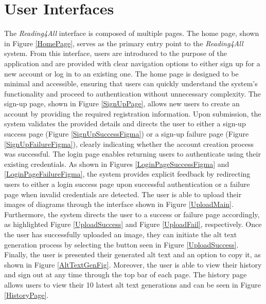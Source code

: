 \documentclass[12pt, titlepage]{article}
\begin{document}

\section{User Interfaces}

The \textit{Reading4All} interface is composed of multiple pages. The home page, shown in Figure \ref{HomePage}, 
serves as the primary entry point to the \textit{Reading4All} system. From this interface, users are introduced 
to the purpose of the application and are provided with clear navigation options to either sign up for a new account 
or log in to an existing one. The home page is designed to be minimal and accessible, ensuring that users can quickly 
understand the system’s functionality and proceed to authentication without unnecessary complexity.
The sign-up page, shown in Figure \ref{SignUpPage}, allows new users to create an account by providing the required 
registration information. Upon submission, the system validates the provided details and directs the user to either a
sign-up success page (Figure \ref{SignUpSuccessFigma}) or a sign-up failure page (Figure \ref{SignUpFailureFigma}),
clearly indicating whether the account creation process was successful.
The login page enables returning users to authenticate using their existing credentials. As shown in Figures \ref{LoginPageSuccessFigma} 
and \ref{LoginPageFailureFigma}, the system provides explicit feedback by redirecting users to either a login success page upon successful
authentication or a failure page when invalid credentials are detected.
The user is able to upload their images of diagrams through the interface shown in Figure \ref{UploadMain}. 
Furthermore, the system directs the user to a success or failure page accordingly, as highlighted Figure
\ref{UploadSuccess} and Figure \ref{UploadFail}, respectively. Once the user has successfully uploaded an 
image, they can initiate the alt text generation process by selecting the button seen in Figure \ref{UploadSuccess}.
Finally, the user is presented their generated alt text and an option to copy it, as shown in Figure \ref{AltTextGenFig}.
Moreover, the user is able to view their history and sign out at any time through the top bar of each page. The history page allows 
users to view their 10 latest alt text generations and can be seen in Figure \ref{HistoryPage}.
\end{document}
